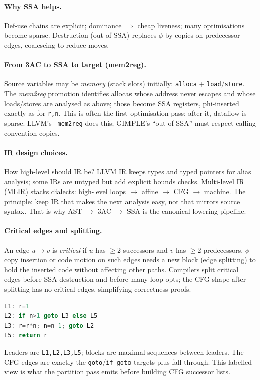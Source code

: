 \paragraph{Why SSA helps.} Def-use chains are explicit; dominance $\Rightarrow$ cheap liveness; many optimisations become sparse. Destruction (out of SSA) replaces $\phi$ by copies on predecessor edges, coalescing to reduce moves.

\paragraph{From 3AC to SSA to target (mem2reg).}
Source variables may be \emph{memory} (stack slots) initially: \texttt{alloca} + \texttt{load}/\texttt{store}. The \emph{mem2reg} promotion identifies allocas whose address never escapes and whose loads/stores are analysed as above; those become SSA registers, phi-inserted exactly as for \texttt{r,n}. This is often the first optimisation pass: after it, dataflow is sparse. LLVM's \texttt{-mem2reg} does this; GIMPLE's ``out of SSA'' must respect calling convention copies.

\paragraph{IR design choices.}
How high-level should IR be? LLVM IR keeps types and typed pointers for alias analysis; some IRs are untyped but add explicit bounds checks. Multi-level IR (MLIR) stacks dialects: high-level loops $\to$ affine $\to$ CFG $\to$ machine. The principle: keep IR that makes the next analysis easy, not that mirrors source syntax. That is why AST $\to$ 3AC $\to$ SSA is the canonical lowering pipeline.

\paragraph{Critical edges and splitting.}
An edge $u\to v$ is \emph{critical} if $u$ has $\ge2$ successors and $v$ has $\ge2$ predecessors. $\phi$-copy insertion or code motion on such edges needs a new block (edge splitting) to hold the inserted code without affecting other paths. Compilers split critical edges before SSA destruction and before many loop opts; the CFG shape after splitting has no critical edges, simplifying correctness proofs.

\begin{example}
\begin{lstlisting}[language=C]
L1: r=1
L2: if n>1 goto L3 else L5
L3: r=r*n; n=n-1; goto L2
L5: return r
\end{lstlisting}
Leaders are \texttt{L1,L2,L3,L5}; blocks are maximal sequences between leaders. The CFG edges are exactly the \texttt{goto}/\texttt{if-goto} targets plus fall-through. This labelled view is what the partition pass emits before building CFG successor lists.
\end{example}

